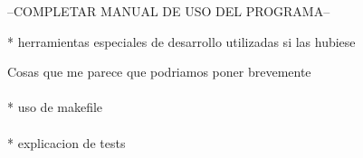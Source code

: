 --COMPLETAR MANUAL DE USO DEL PROGRAMA--

* herramientas especiales de desarrollo utilizadas si las hubiese

Cosas que me parece que podriamos poner brevemente
\\
\\
* uso de makefile
\\
\\
* explicacion de tests